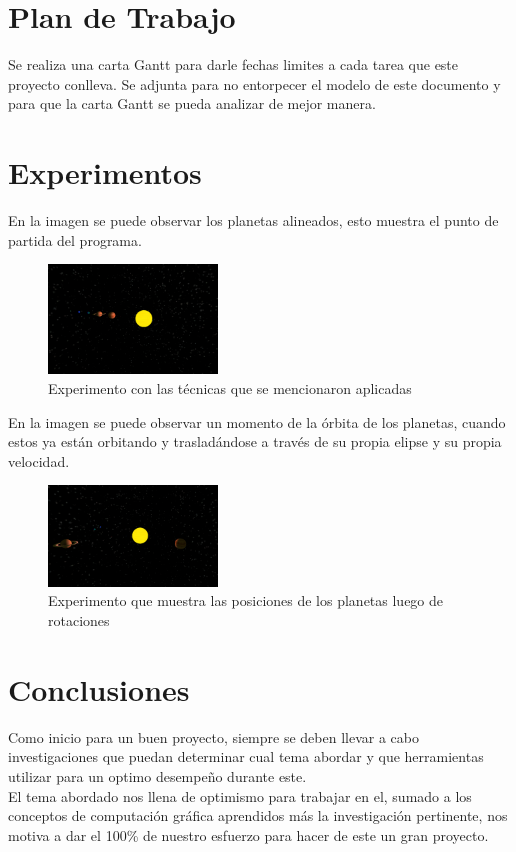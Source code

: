 \documentclass[12pt,journal,compsoc]{IEEEtran}
\begin{document}
\section{Plan de Trabajo}
Se realiza una carta Gantt para darle fechas limites a cada tarea que este proyecto conlleva. Se adjunta para no entorpecer el modelo de este documento y para que la carta Gantt se pueda analizar de mejor manera.
%
\section{Experimentos}
En la imagen se puede observar los planetas alineados, esto muestra el punto de partida del programa.
%
\begin{figure}[h!]
	\includegraphics[width=0.4\textwidth, height=0.25\textwidth]{1.png}
	\centering
	\caption{Experimento con las técnicas que se mencionaron aplicadas}
\end{figure}
%
En la imagen se puede observar un momento de la órbita de los planetas, cuando estos ya están orbitando y trasladándose a través de su propia elipse y su propia velocidad.
%
\begin{figure}[h!]
	\includegraphics[width=0.4\textwidth, height=0.25\textwidth]{2.png}
	\centering
	\caption{Experimento que muestra las posiciones de los planetas luego de rotaciones}
\end{figure}
%
%
\section{Conclusiones}
%
Como inicio para un buen proyecto, siempre se deben llevar a cabo investigaciones que puedan determinar cual tema abordar y que herramientas utilizar para un optimo desempeño durante este.\\
El tema abordado nos llena de optimismo para trabajar en el, sumado a los conceptos de computación gráfica aprendidos más la investigación pertinente, nos motiva a dar el 100\% de nuestro esfuerzo para hacer de este un gran proyecto.
%


\end{document}
